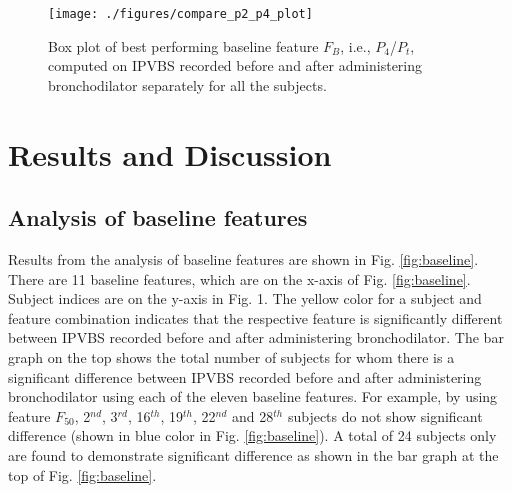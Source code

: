 \documentclass{article}
\begin{document}
\begin{figure}
	\centering
	\texttt{[image: ./figures/compare\_p2\_p4\_plot]}
	
	\caption{Box plot of best performing baseline feature $F_B$, i.e., $P_{4}$/$P_{t}$, computed on IPVBS recorded before and after administering bronchodilator separately for all the subjects.}
	\label{fig:baseline_best_feature}	
\end{figure}


	

		
	
\section{Results and Discussion}
\subsection{Analysis of baseline features}

Results from the analysis of baseline features are shown in Fig. \ref{fig:baseline}. There are 11 baseline features, which are on the x-axis of Fig. \ref{fig:baseline}.
Subject indices are on the y-axis in Fig. 1. The yellow color for a subject and feature combination indicates that the respective feature is significantly different between IPVBS recorded before and after administering bronchodilator.  The bar graph on the top shows the total number of subjects for whom there is a significant difference between IPVBS recorded before and after administering bronchodilator using each of the eleven baseline features. For example, by using feature $F_{50}$, 2$^{nd}$, 3$^{rd}$, 16$^{th}$, 19$^{th}$, 22$^{nd}$ and 28$^{th}$ subjects do not show significant difference (shown in blue color in Fig. \ref{fig:baseline}). A total of 24 subjects only are found to demonstrate significant difference as shown in the bar graph at the top of Fig. \ref{fig:baseline}.\\
\end{document}
